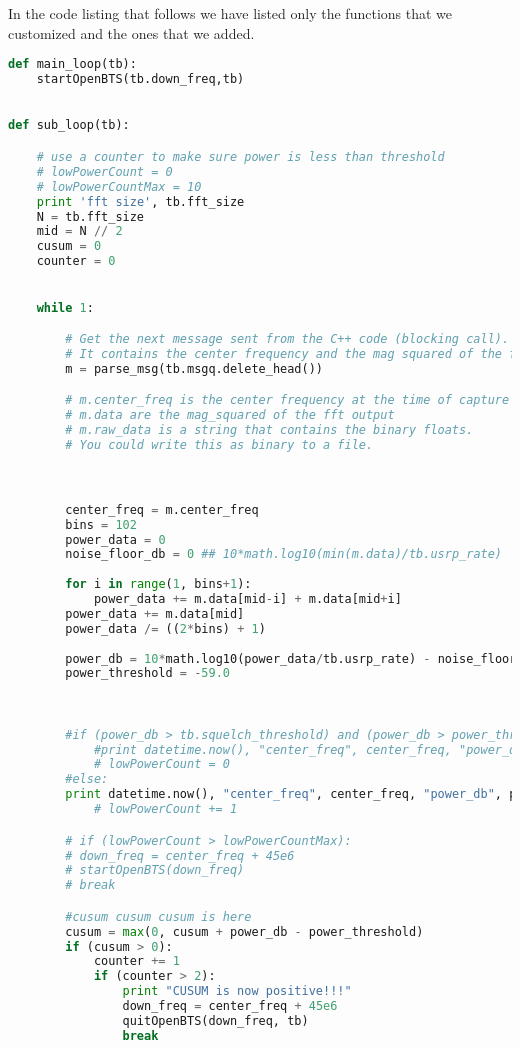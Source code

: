 In the code listing that follows we have listed only the functions that we
customized and the ones that we added.

\begin{lstlisting}[language=Python]
def main_loop(tb):
    startOpenBTS(tb.down_freq,tb)

    
def sub_loop(tb):

    # use a counter to make sure power is less than threshold
    # lowPowerCount = 0
    # lowPowerCountMax = 10
    print 'fft size', tb.fft_size
    N = tb.fft_size
    mid = N // 2
    cusum = 0
    counter = 0
    

    while 1:

        # Get the next message sent from the C++ code (blocking call).
        # It contains the center frequency and the mag squared of the fft
        m = parse_msg(tb.msgq.delete_head())

        # m.center_freq is the center frequency at the time of capture
        # m.data are the mag_squared of the fft output
        # m.raw_data is a string that contains the binary floats.
        # You could write this as binary to a file.



        center_freq = m.center_freq
        bins = 102
        power_data = 0
        noise_floor_db = 0 ## 10*math.log10(min(m.data)/tb.usrp_rate)
        
        for i in range(1, bins+1):
            power_data += m.data[mid-i] + m.data[mid+i]
        power_data += m.data[mid]
        power_data /= ((2*bins) + 1)
        
        power_db = 10*math.log10(power_data/tb.usrp_rate) - noise_floor_db
        power_threshold = -59.0
        
        

        #if (power_db > tb.squelch_threshold) and (power_db > power_threshold):
            #print datetime.now(), "center_freq", center_freq, "power_db", power_db, "in use"
            # lowPowerCount = 0
        #else:
        print datetime.now(), "center_freq", center_freq, "power_db", power_db
            # lowPowerCount += 1

        # if (lowPowerCount > lowPowerCountMax):
        # down_freq = center_freq + 45e6
        # startOpenBTS(down_freq)
        # break

        #cusum cusum cusum is here
        cusum = max(0, cusum + power_db - power_threshold)
        if (cusum > 0):
            counter += 1
            if (counter > 2):
                print "CUSUM is now positive!!!"
                down_freq = center_freq + 45e6
                quitOpenBTS(down_freq, tb)
                break


\end{lstlisting}

